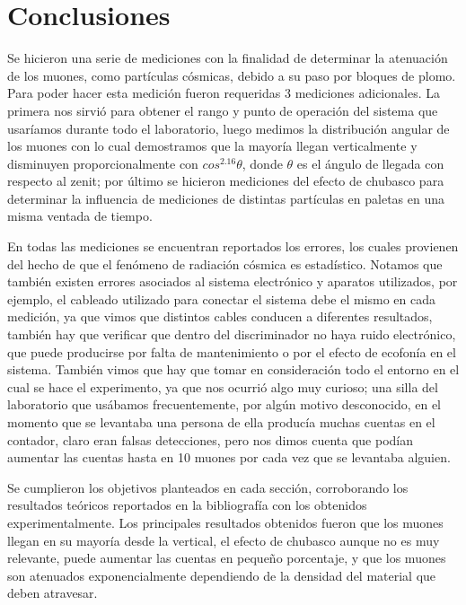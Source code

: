 \documentclass[a4paper,10pt]{article}
\numberwithin{equation}{section}
\begin{document}
\section{Conclusiones}

Se hicieron una serie de mediciones con la finalidad de determinar la atenuación de 
los muones, como partículas cósmicas, debido a su paso por bloques de plomo. Para poder 
hacer esta medición fueron requeridas 3 mediciones adicionales. La primera nos sirvió 
para obtener el rango y punto de operación del sistema que usaríamos durante todo 
el laboratorio, luego medimos la distribución angular de los muones con lo cual 
demostramos que la mayoría llegan verticalmente y disminuyen proporcionalmente 
con $cos^{2.16}{\theta}$, donde $\theta$ es el ángulo de llegada con respecto 
al zenit; por último se hicieron mediciones del efecto de chubasco para determinar 
la influencia de mediciones de distintas partículas en paletas  en 
una misma ventada de tiempo. 

\vspace{.3cm}

En todas las mediciones se encuentran reportados los errores, los cuales provienen 
del hecho de que el fenómeno de radiación cósmica es estadístico. Notamos que 
también existen errores asociados al sistema electrónico y aparatos utilizados, por 
ejemplo, el cableado utilizado para conectar el sistema debe el mismo en cada 
medición, ya que vimos que distintos cables conducen a diferentes resultados, también 
hay que verificar que dentro del discriminador no haya ruido electrónico, que puede 
producirse por falta de mantenimiento o por el efecto de ecofonía en el sistema. También 
vimos que hay que tomar en consideración todo el entorno en el cual se hace el 
experimento, ya que nos ocurrió algo muy curioso; una silla del laboratorio que 
usábamos frecuentemente, por algún motivo desconocido, en el momento que se levantaba 
una persona de ella producía muchas cuentas en el contador, claro eran falsas 
detecciones, pero nos dimos cuenta que podían aumentar las cuentas hasta en 
10 muones por cada vez que se levantaba alguien.

\vspace{.3cm}

Se cumplieron los objetivos planteados en cada sección, corroborando los resultados 
teóricos reportados en la bibliografía con los obtenidos experimentalmente. Los 
principales resultados obtenidos fueron que los muones llegan en su mayoría desde la 
vertical, el efecto de chubasco aunque no es muy relevante, puede aumentar las cuentas 
en pequeño porcentaje, y que los muones son atenuados exponencialmente dependiendo 
de la densidad del material que deben atravesar.
\end{document}
